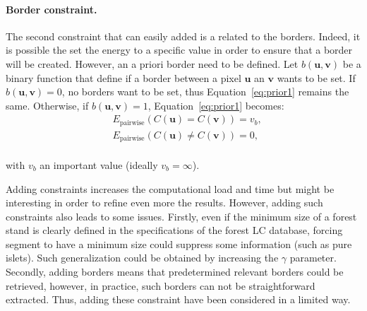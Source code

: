 \paragraph{Border constraint. \\}
The second constraint that can easily added is a related to the borders. Indeed, it is possible the set the energy to a specific value in order  to ensure that a border will be created. However, an a priori border need to be defined. Let $b(\mathbf{u},\mathbf{v})$ be a binary function that define if a border between a pixel $\mathbf{u}$ an $\mathbf{v}$ wants to be set. If $b(\mathbf{u},\mathbf{v})=0$, no borders want to be set, thus Equation~\ref{eq:prior1} remains the same. Otherwise, if $b(\mathbf{u},\mathbf{v})=1$, Equation~\ref{eq:prior1} becomes:
\begin{equation}
\begin{aligned}
& E_{\text{pairwise}}(C(\mathbf{u}) = C(\mathbf{v}))=v_{b}, \\
& E_{\text{pairwise}}(C(\mathbf{u}) \neq C(\mathbf{v}))=0,
\end{aligned}
\label{eq:prior1c}
\end{equation}\\
with $v_{b}$ an important value (ideally $v_{b}=\infty$).

Adding constraints increases the computational load and time but might be interesting in order to refine even more the results. However, adding such constraints also leads to some issues. Firstly, even if the minimum size of a forest stand is clearly defined in the specifications of the forest LC database, forcing segment to have a minimum size could suppress some information (such as pure islets). Such generalization could be obtained by increasing the $\gamma$ parameter. Secondly, adding borders means that predetermined relevant borders could be retrieved, however, in practice, such borders can not be straightforward  extracted. Thus, adding these constraint have been considered in a limited way.


\stopcontents[chapters]